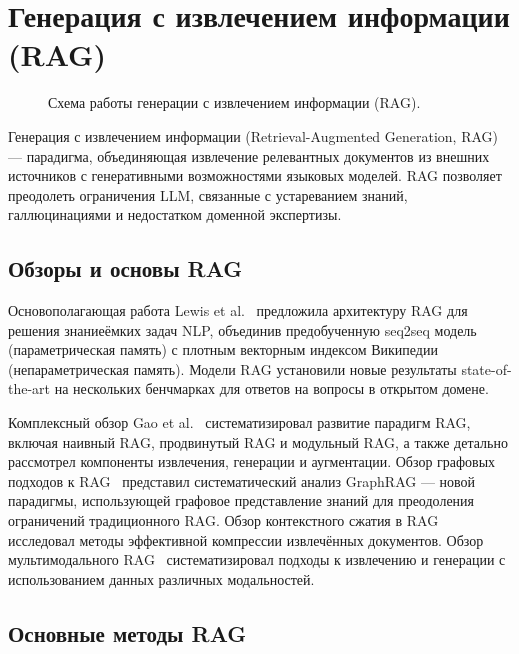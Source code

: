 \section{Генерация с извлечением информации (RAG)}\label{sec:rag}

\begin{figure}[htbp]
    \centering
    \resizebox{0.9\textwidth}{!}{
        
    }
    \caption{Схема работы генерации с извлечением информации (RAG).}
    \label{fig:rag_pipeline}
\end{figure}

Генерация с извлечением информации (Retrieval-Augmented Generation, RAG) --- парадигма, объединяющая извлечение релевантных документов из внешних источников с генеративными возможностями языковых моделей. RAG позволяет преодолеть ограничения LLM, связанные с устареванием знаний, галлюцинациями и недостатком доменной экспертизы.

\subsection{Обзоры и основы RAG}\label{subsec:rag_surveys}

Основополагающая работа Lewis et al.~\cite{2005.11401} предложила архитектуру RAG для решения знаниеёмких задач NLP, объединив предобученную seq2seq модель (параметрическая память) с плотным векторным индексом Википедии (непараметрическая память). Модели RAG установили новые результаты state-of-the-art на нескольких бенчмарках для ответов на вопросы в открытом домене.

Комплексный обзор Gao et al.~\cite{2312.10997} систематизировал развитие парадигм RAG, включая наивный RAG, продвинутый RAG и модульный RAG, а также детально рассмотрел компоненты извлечения, генерации и аугментации. Обзор графовых подходов к RAG~\cite{2501.13958} представил систематический анализ GraphRAG --- новой парадигмы, использующей графовое представление знаний для преодоления ограничений традиционного RAG. Обзор контекстного сжатия в RAG~\cite{2409.13385} исследовал методы эффективной компрессии извлечённых документов. Обзор мультимодального RAG~\cite{2504.08748} систематизировал подходы к извлечению и генерации с использованием данных различных модальностей.

\subsection{Основные методы RAG}\label{subsec:core_rag}

